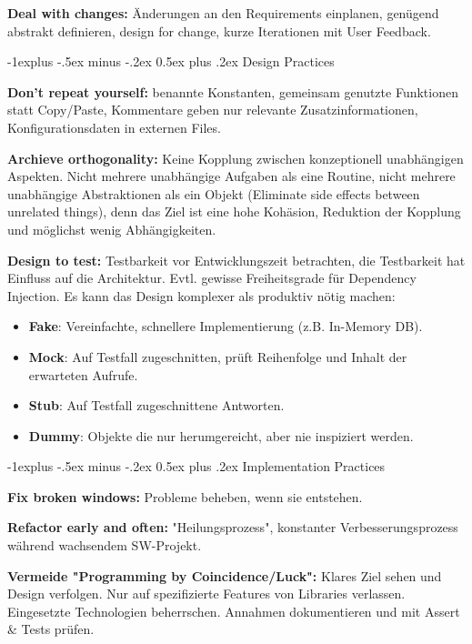\documentclass[a4paper, fontsize=6pt]{scrartcl}
\makeatletter
\renewcommand{\subsection}{\@startsection{subsection}{2}{0mm}%
    {-1explus -.5ex minus -.2ex}%
    {0.5ex plus .2ex}%
    {\normalfont\normalsize\bfseries}}
\makeatother
\begin{document}
\begin{multicols*}{5}
\textbf{Deal with changes:} Änderungen an den Requirements einplanen, genügend abstrakt definieren, design for change, kurze Iterationen mit User Feedback.

\subsection{Design Practices}

\textbf{Don't repeat yourself:} benannte Konstanten, gemeinsam genutzte Funktionen statt Copy/Paste, Kommentare geben nur relevante Zusatzinformationen, Konfigurationsdaten in externen Files.

\textbf{Archieve orthogonality:} Keine Kopplung zwischen konzeptionell unabhängigen Aspekten. Nicht mehrere unabhängige Aufgaben als eine Routine, nicht mehrere unabhängige Abstraktionen als ein Objekt (Eliminate side effects between unrelated things), denn das Ziel ist eine hohe Kohäsion, Reduktion der Kopplung und möglichst wenig Abhängigkeiten.

\textbf{Design to test:} Testbarkeit vor Entwicklungszeit betrachten, die Testbarkeit hat Einfluss auf die Architektur. Evtl. gewisse Freiheitsgrade für Dependency Injection. Es kann das Design komplexer als produktiv nötig machen:

\begin{itemize}
    \item \textbf{Fake}: Vereinfachte, schnellere Implementierung (z.B. In-Memory DB).
    \item \textbf{Mock}: Auf Testfall zugeschnitten, prüft Reihenfolge und Inhalt der erwarteten Aufrufe.
    \item \textbf{Stub}: Auf Testfall zugeschnittene Antworten.
    \item \textbf{Dummy}: Objekte die nur herumgereicht, aber nie inspiziert werden.
\end{itemize}

\subsection{Implementation Practices}

\textbf{Fix broken windows:} Probleme beheben, wenn sie entstehen.

\textbf{Refactor early and often:} "Heilungsprozess", konstanter Verbesserungsprozess während wachsendem SW-Projekt.

\textbf{Vermeide "Programming by Coincidence/Luck":} Klares Ziel sehen und Design verfolgen. Nur auf spezifizierte Features von Libraries verlassen. Eingesetzte Technologien beherrschen. Annahmen dokumentieren und mit Assert \& Tests prüfen.


\end{multicols*}
\end{document}
